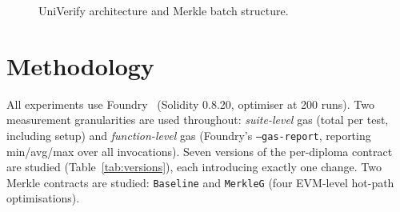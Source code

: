 \documentclass[conference]{IEEEtran}
\begin{document}
\begin{figure}[t]
{%
\label{fig:merkle}%
}
\caption{UniVerify architecture and Merkle batch structure.}
\label{fig:overview}
\end{figure}

\section{Methodology}
\label{sec:method}

All experiments use Foundry~\cite{foundry2023}
(Solidity 0.8.20, optimiser at 200 runs).
Two measurement granularities are used throughout:
\emph{suite-level} gas (total per test, including setup)
and \emph{function-level} gas (Foundry's \texttt{--gas-report},
reporting min/avg/max over all invocations).
Seven versions of the per-diploma contract are studied
(Table~\ref{tab:versions}), each introducing exactly one change.
Two Merkle contracts are studied: \texttt{Baseline}
and \texttt{MerkleG} (four EVM-level hot-path optimisations).
\end{document}
